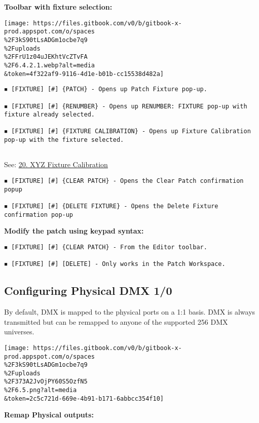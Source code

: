 \documentclass[
]{article}
\begin{document}
\textbf{Toolbar with fixture selection:}

\texttt{[image: https://files.gitbook.com/v0/b/gitbook-x-prod.appspot.com/o/spaces\\\%2F3kS90tLsADGm1ocbe7q9\\\%2Fuploads\\\%2FFrU1z04uJEKhtVcZTvFA\\\%2F6.4.2.1.webp?alt=media\\\&token=4f322af9-9116-4d1e-b01b-cc15538d482a]}

\begin{verbatim}
◾ [FIXTURE] [#] {PATCH} - Opens up Patch Fixture pop-up. 

◾ [FIXTURE] [#] {RENUMBER} - Opens up RENUMBER: FIXTURE pop-up with fixture already selected. 

◾ [FIXTURE] [#] {FIXTURE CALIBRATION} - Opens up Fixture Calibration pop-up with the fixture selected. 
  
\end{verbatim}

See:
\href{https://vibemanual.compulite.com/xyz-fixture-calibration.html}{20. XYZ Fixture Calibration}

\begin{verbatim}
◾ [FIXTURE] [#] {CLEAR PATCH} - Opens the Clear Patch confirmation popup 

◾ [FIXTURE] [#] {DELETE FIXTURE} - Opens the Delete Fixture confirmation pop-up
\end{verbatim}

\textbf{Modify the patch using keypad syntax:}

\begin{verbatim}
◾ [FIXTURE] [#] {CLEAR PATCH} - From the Editor toolbar. 

◾ [FIXTURE] [#] [DELETE] - Only works in the Patch Workspace.
\end{verbatim}

\hypertarget{configuring-physical-dmx-10}{%
\subsection{Configuring Physical DMX 1/0}\label{configuring-physical-dmx-10}}

By default, DMX is mapped to the physical ports on a 1:1 basis.
DMX is always transmitted but can be remapped to anyone of the supported 256 DMX universes.

\texttt{[image: https://files.gitbook.com/v0/b/gitbook-x-prod.appspot.com/o/spaces\\\%2F3kS90tLsADGm1ocbe7q9\\\%2Fuploads\\\%2F373A2JvOjPY60S5OzfN5\\\%2F6.5.png?alt=media\\\&token=2c5c721d-669e-4b91-b171-6abbcc354f10]}

\textbf{Remap Physical outputs:}
\end{document}
